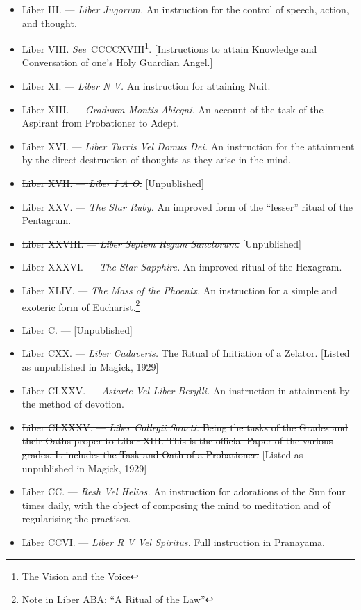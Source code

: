\begin{itemize}
\item Liber III. --- \textit{Liber Jugorum.} An instruction for the control of speech, action, and thought.
\item Liber VIII. \textit{See}{}\-\ CCCCXVIII\footnote{The Vision and the Voice}. [Instructions to attain Knowledge and Conversation of one's Holy Guardian Angel.]
\item Liber XI. --- \textit{Liber N V.} An instruction for attaining Nuit.
\item Liber XIII. --- \textit{Graduum Montis Abiegni.} An account of the task of the Aspirant from Probationer to Adept.
\item Liber XVI. --- \textit{Liber Turris Vel Domus Dei.} An instruction for the attainment by the direct destruction of thoughts as they arise in the mind.
\item \sout{Liber XVII. --- \textit{Liber I A O.}} [Unpublished]
\item Liber XXV. --- \textit{The Star Ruby.} An improved form of the \enquote{lesser} ritual of the Pentagram.
\item \sout{Liber XXVIII. --- \textit{Liber Septem Regum Sanctorum.}} [Unpublished]
\item Liber XXXVI. --- \textit{The Star Sapphire.} An improved ritual of the Hexagram.
\item Liber XLIV. --- \textit{The Mass of the Phoenix.} An instruction for a simple and exoteric form of Eucharist.\footnote{Note in Liber ABA: \enquote{A Ritual of the Law}}
\item \sout{Liber C. --- \textit{}} [Unpublished]
\item \sout{Liber CXX. --- \textit{Liber Cadaveris.} The Ritual of Initiation of a Zelator.} [Listed as unpublished in Magick, 1929]
\item Liber CLXXV. --- \textit{Astarte Vel Liber Berylli.} An instruction in attainment by the method of devotion.
\item \sout{Liber CLXXXV. --- \textit{Liber Collegii Sancti.} Being the tasks of the Grades and their Oaths proper to Liber XIII. This is the official Paper of the various grades. It includes the Task and Oath of a Probationer.} [Listed as unpublished in Magick, 1929]
\item Liber CC. --- \textit{Resh Vel Helios.} An instruction for adorations of the Sun four times daily, with the object of composing the mind to meditation and of regularising the practises.
\item Liber CCVI. --- \textit{Liber R V Vel Spiritus.} Full instruction in Pranayama.

\end{itemize}
